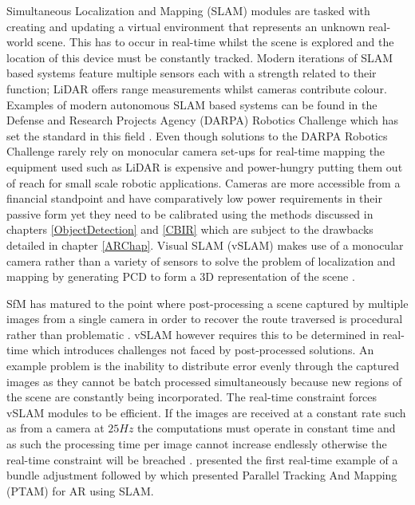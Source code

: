 Simultaneous Localization and Mapping (SLAM) modules are tasked with creating and updating a virtual environment that represents an unknown real-world scene. This has to occur in real-time whilst the scene is explored and the location of this device must be constantly tracked. Modern iterations of SLAM based systems feature multiple sensors each with a strength related to their function; LiDAR offers range measurements whilst cameras contribute colour. Examples of modern autonomous SLAM based systems can be found in the Defense and Research Projects Agency (DARPA) Robotics Challenge which has set the standard in this field \citep{molinos_perception_2014}. Even though solutions to the DARPA Robotics Challenge rarely rely on monocular camera set-ups for real-time mapping the equipment used such as LiDAR is expensive and power-hungry putting them out of reach for small scale robotic applications. Cameras are more accessible from a financial standpoint and have comparatively low power requirements in their passive form yet they need to be calibrated using the methods discussed in chapters \ref{ObjectDetection} and \ref{CBIR} which are subject to the drawbacks detailed in chapter \ref{ARChap}. Visual SLAM (vSLAM) makes use of a monocular camera rather than a variety of sensors to solve the problem of localization and mapping by generating PCD to form a 3D representation of the scene \citep{weiss_visual_2014}.

SfM has matured to the point where post-processing a scene captured by multiple images from a single camera in order to recover the route traversed is procedural rather than problematic \citep{fitzgibbon_automatic_1998}. vSLAM however requires this to be determined in real-time which introduces challenges not faced by post-processed solutions. An example problem is the inability to distribute error evenly through the captured images as they cannot be batch processed simultaneously because new regions of the scene are constantly being incorporated. The real-time constraint forces vSLAM modules to be efficient. If the images are received at a constant rate such as from a camera at $25Hz$ the computations must operate in constant time and as such the processing time per image cannot increase endlessly otherwise the real-time constraint will be breached \citep{davison_real-time_2003}. \citet{mouragnon_real_2006} presented the first real-time example of a bundle adjustment followed by \citet{klein_parallel_2007} which presented Parallel Tracking And Mapping (PTAM) for AR using SLAM.

